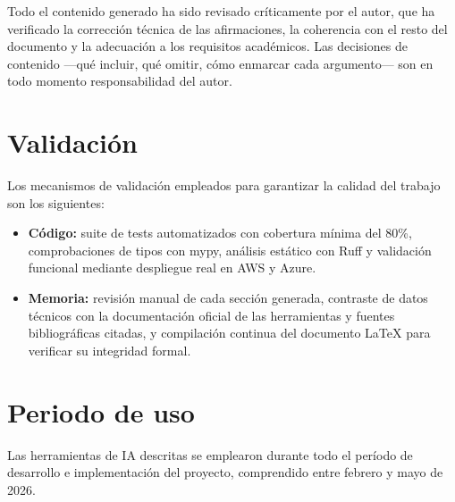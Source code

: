 Todo el contenido generado ha sido revisado críticamente por el autor, que ha verificado
la corrección técnica de las afirmaciones, la coherencia con el resto del documento y
la adecuación a los requisitos académicos. Las decisiones de contenido —qué incluir,
qué omitir, cómo enmarcar cada argumento— son en todo momento responsabilidad del autor.

\section*{Validación}

Los mecanismos de validación empleados para garantizar la calidad del trabajo son los
siguientes:

\begin{itemize}
    \item \textbf{Código:} suite de tests automatizados con cobertura mínima del 80\%,
    comprobaciones de tipos con mypy, análisis estático con Ruff y validación funcional
    mediante despliegue real en AWS y Azure.
    \item \textbf{Memoria:} revisión manual de cada sección generada, contraste de datos
    técnicos con la documentación oficial de las herramientas y fuentes bibliográficas
    citadas, y compilación continua del documento LaTeX para verificar su integridad formal.
\end{itemize}

\section*{Periodo de uso}

Las herramientas de IA descritas se emplearon durante todo el período de desarrollo e
implementación del proyecto, comprendido entre febrero y mayo de 2026.
